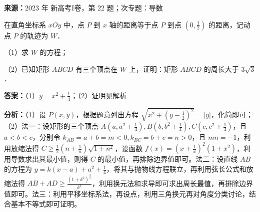 \begin{question}[points=12]
\textbf{来源：}2023 年 新高考I卷，第 22 题；次专题：导数\par
在直角坐标系 $xOy$ 中，点 $P$ 到 $x$ 轴的距离等于点 $P$ 到点 $(0,\frac{1}{2})$ 的距离，记动点 $P$ 的轨迹为 $W$．

（1）求 $W$ 的方程；

（2）已知矩形 $ABCD$ 有三个顶点在 $W$ 上，证明：矩形 $ABCD$ 的周长大于 $3\sqrt{3}$．
\begin{solution}
\textbf{答案：}（1）$y=x^2+\frac{1}{4}$；（2）证明见解析

\textbf{分析：}（1）设 $P(x,y)$，根据题意列出方程 $\sqrt{x^2+(y-\frac{1}{2})^2}=|y|$，化简即可；（2）法一：设矩形的三个顶点 $A(a,a^2+\frac{1}{4}), B(b,b^2+\frac{1}{4}), C(c,c^2+\frac{1}{4})$，且 $a<b<c$，分别令 $k_{AB}=a+b=m<0, k_{BC}=b+c=n>0$，且 $mn=-1$，利用放缩法得 $C\geq \frac{1}{2}(n+\frac{1}{n})\sqrt{1+n^2}$，设函数 $f(x)=(x+\frac{1}{x})^2(1+x^2)$，利用导数求出其最小值，则得 $C$ 的最小值，再排除边界值即可。法二：设直线 $AB$ 的方程为 $y=k(x-a)+a^2+\frac{1}{4}$，将其与抛物线方程联立，再利用弦长公式和放缩法得 $AB+AD\geq \frac{(1+k^2)^{\frac{3}{2}}}{k^2}$，利用换元法和求导即可求出周长最值，再排除边界值即可。法三：利用平移坐标系法，再设点，利用三角换元再对角度分类讨论，结合基本不等式即可证明。


\end{solution}
\end{question}
